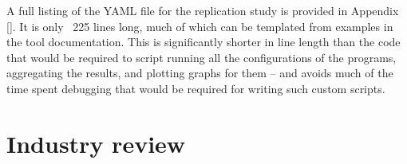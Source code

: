 

A full listing of the YAML file for the replication study is provided in Appendix \ref{}. It is only ~225 lines long, much of which can be templated from examples in the tool documentation. This is significantly shorter in line length than the code that would be required to script running all the configurations of the programs, aggregating the results, and plotting graphs for them -- and avoids much of the time spent debugging that would be required for writing such custom scripts.





\section{Industry review}
\label{sec:hpc-multibench-industry-review} %

